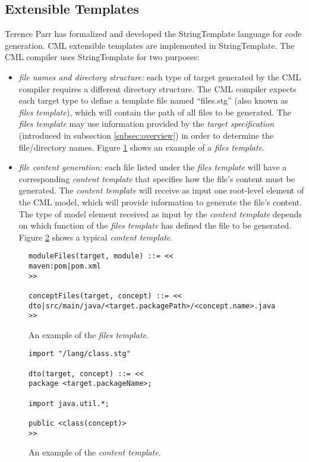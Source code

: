 \subsection{Extensible Templates}\label{subsec:templates}

Terence Parr has formalized and developed the StringTemplate \cite{st} language for code generation. CML extensible templates are implemented in StringTemplate. The CML compiler uses StringTemplate for two purposes:

\begin{itemize}
\item \emph{file names and directory structure:}
each type of target generated by the CML compiler requires a different directory structure.
The CML compiler expects each target type to define a template file named ``files.stg'' (also known as \emph{files template}),
which will contain the path of all files to be generated. The \emph{files template} may use information provided by the \emph{target specification} (introduced in subsection \ref{subsec:overview}) in order to determine the file/directory names. Figure \ref{fig:template1} shows an example of a \emph{files template}.
\item \emph{file content generation:}
each file listed under the \emph{files template} will have a corresponding \emph{content template} that specifies how the file's content must be generated. The \emph{content template} will receive as input one root-level element of the CML model, which will provide information to generate the file's content. The type of model element received as input by the \emph{content template} depends on which function of the \emph{files template} has defined the file to be generated. Figure \ref{fig:template2} shows a typical \emph{content template}. 
\end{itemize}

\begin{figure}
\verbatimfont{\small}
\begin{verbatim}
moduleFiles(target, module) ::= <<
maven:pom|pom.xml
>>

conceptFiles(target, concept) ::= <<
dto|src/main/java/<target.packagePath>/<concept.name>.java
>>
\end{verbatim}
\caption{An example of the \emph{files template}.}
\label{fig:template1}
\end{figure}

\begin{figure}
\verbatimfont{\small}
\begin{verbatim}
import "/lang/class.stg"

dto(target, concept) ::= <<
package <target.packageName>;

import java.util.*;

public <class(concept)>
>>
\end{verbatim}
\caption{An example of the \emph{content template}.}
\label{fig:template2}
\end{figure}

